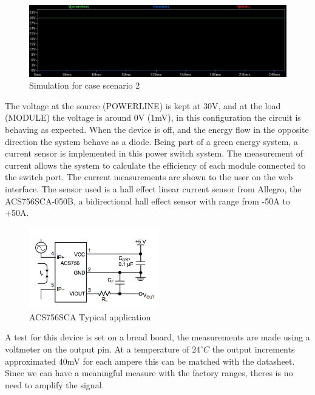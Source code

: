 %
\begin{figure}[H]
	\begin{centering}
		\includegraphics[width=1\textwidth]{images/tb5_LTC_simu2.png}
		\caption{Simulation for case scenario 2}
	\end{centering}
\end{figure}
%
The voltage at the source (POWERLINE) is kept at 30V, and at the load (MODULE) the voltage is around 0V (1mV), in this configuration the circuit is behaving as expected. When the device is off, and the energy flow in the opposite direction the system behave as a diode.
%
%
Being part of a green energy system, a current sensor is implemented in this power switch system. The measurement of current allows the system to calculate the efficiency of each module connected to the switch port. The current measurements are shown to the user on the web interface.
%
The sensor used is a hall effect linear current sensor from Allegro, the ACS756SCA-050B, a bidirectional hall effect sensor with range from -50A to +50A.
%
\begin{figure}[H]
	\begin{centering}
		\includegraphics[width=0.5\textwidth]{images/current_sensor.png}
		\caption{ACS756SCA Typical application}
	\end{centering}
\end{figure}
%
A test for this device is set on a bread board, the measurements are made using a voltmeter on the output pin. At a temperature of $ 24^\circ C $ the output increments approximated 40mV for each ampere this can be matched with the datasheet. Since we can have a meaningful measure with the factory ranges, theres is no need to amplify the signal.
